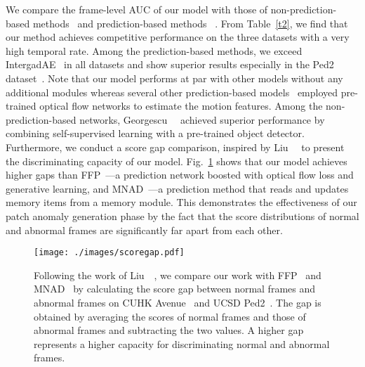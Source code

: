 \documentclass[10pt,twocolumn,letterpaper]{article}
\begin{document}
We compare the frame-level AUC of our model with those of non-prediction-based methods~\cite{hasan2016learning,luo2017revisit,ravanbakhsh2017abnormal, sultani2018real, ravanbakhsh2019training, nguyen2019hybrid, gong2019memorizing, ionescu2019object, park2020learning, yu2020cloze, zaheer2020old, georgescu2021anomaly, Georgescu_2021} and prediction-based methods~ \cite{Liu_2018_CVPR, tang2020integrating, Nguyen_2019_ICCV, park2020learning}. From Table~\ref{t2}, we find that our method achieves competitive performance on the three datasets with a very high temporal rate. Among the prediction-based methods, we exceed IntergadAE~\cite{tang2020integrating} in all datasets and show superior results especially in the Ped2 dataset~\cite{mahadevan2010anomaly}. Note that our model performs at par with other models without any additional modules whereas several other prediction-based models~\cite{Liu_2018_CVPR, tang2020integrating, Nguyen_2019_ICCV} employed pre-trained optical flow networks to estimate the motion features. Among the non-prediction-based networks, Georgescu~\etal~\cite{georgescu2021anomaly} achieved superior performance by combining self-supervised learning with a pre-trained object detector.\\
\indent Furthermore, we conduct a score gap comparison, inspired by Liu~\etal~\cite{Liu_2018_CVPR} to present the discriminating capacity of our model. Fig.~\ref{scoregap} shows that our model achieves higher gaps than FFP~\cite{Liu_2018_CVPR}—a prediction network boosted with optical flow loss and generative learning, and MNAD~\cite{park2020learning}—a prediction method that reads and updates memory items from a memory module. This demonstrates the effectiveness of our patch anomaly generation phase by the fact that the score distributions of normal and abnormal frames are significantly far apart from each other. 

\begin{figure}[!t]
	\begin{center}
		\vspace{-0.5cm}
		\texttt{[image: ./images/scoregap.pdf]}
	\end{center}
	\vspace{-0.5cm}
	\caption{Following the work of Liu~\etal~\cite{Liu_2018_CVPR}, we compare our work with FFP~\cite{Liu_2018_CVPR} and MNAD~\cite{park2020learning} by calculating the score gap between normal frames and abnormal frames on CUHK Avenue~\cite{lu2013abnormal} and UCSD Ped2~\cite{mahadevan2010anomaly}. The gap is obtained by averaging the scores of normal frames and those of abnormal frames and subtracting the two values. A higher gap represents a higher capacity for discriminating normal and abnormal frames.}
	\label{scoregap}
\end{figure}
\end{document}
